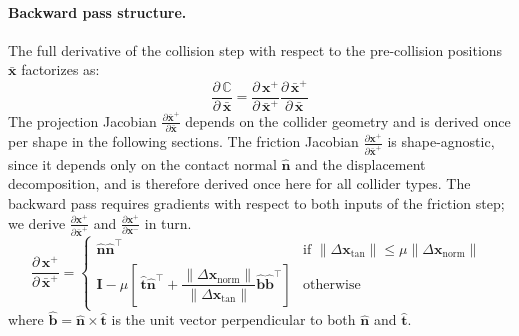 \documentclass{article}
\newcommand{\pd}[2]{\dfrac{\partial\, #1}{\partial\, #2}}
\newcommand{\pdc}[2]{\frac{\partial #1}{\partial #2}}
\begin{document}
\paragraph{Backward pass structure.}
The full derivative of the collision step with respect to the pre-collision positions $\bar{\mathbf{x}}$ factorizes as:
\begin{equation}
\label{eq:collision_chain}
    \pd{\mathbb{C}}{\bar{\mathbf{x}}} = 
    \pd{\mathbf{x}^+}{\bar{\mathbf{x}}^+}
    \pd{\bar{\mathbf{x}}^+}{\bar{\mathbf{x}}}
\end{equation}
The projection Jacobian $\pdc{\bar{\mathbf{x}}^+}{\bar{\mathbf{x}}}$ depends on the collider geometry and is derived once per shape in the following sections. The friction Jacobian $\pdc{\mathbf{x}^+}{\bar{\mathbf{x}}^+}$ is shape-agnostic, since it depends only on the contact normal $\hat{\mathbf{n}}$ and the displacement decomposition, and is therefore derived once here for all collider types. The backward pass requires gradients with respect to both inputs of the friction step; we derive $\pdc{\mathbf{x}^+}{\bar{\mathbf{x}}^+}$ and $\pdc{\mathbf{x}^+}{\mathbf{x}^-}$ in turn.
\begin{equation}
\label{eq:friction_gradient}
    \pd{\mathbf{x}^+}{\bar{\mathbf{x}}^+} = 
    \begin{cases}
        \hat{\mathbf{n}}\hat{\mathbf{n}}^\top
        & \text{if } \|\Delta\mathbf{x}_{\text{tan}}\| \leq \mu\|\Delta\mathbf{x}_{\text{norm}}\| \ \\
        \mathbf{I} - \mu\left[\ 
            \hat{\mathbf{t}}\hat{\mathbf{n}}^\top + 
            \dfrac{\|\Delta\mathbf{x}_{\text{norm}}\|}{ \|\Delta\mathbf{x}_{\text{tan}}\|}\hat{\mathbf{b}}\hat{\mathbf{b}}^\top
        \right]
        & \text{otherwise }
    \end{cases}
\end{equation}
where $\hat{\mathbf{b}} = \hat{\mathbf{n}}\times \hat{\mathbf{t}}$ is the unit vector perpendicular to both $\hat{\mathbf{n}}$ and $\hat{\mathbf{t}}$.
\end{document}
